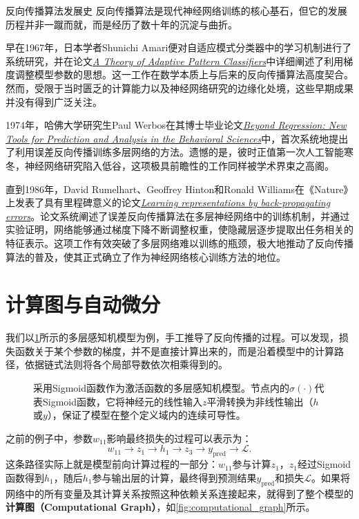 \begin{cyanBox}{反向传播算法发展史}
反向传播算法是现代神经网络训练的核心基石，但它的发展历程并非一蹴而就，而是经历了数十年的沉淀与曲折。

早在1967年，日本学者Shunichi Amari便对自适应模式分类器中的学习机制进行了系统研究，并在论文\href{https://ieeexplore.ieee.org/document/4039068}{\textit{A Theory of Adaptive Pattern Classifiers}}中详细阐述了利用梯度调整模型参数的思想。这一工作在数学本质上与后来的反向传播算法高度契合。然而，受限于当时匮乏的计算能力以及神经网络研究的边缘化处境，这些早期成果并没有得到广泛关注。

1974年，哈佛大学研究生Paul Werbos在其博士毕业论文\href{https://perceptrondemo.com/assets/PJW_thesis_Beyond_Regression_1974-4b63aa5f.pdf}{\textit{Beyond Regression: New Tools for Prediction and Analysis in the Behavioral Sciences}}中，首次系统地提出了利用误差反向传播训练多层网络的方法。遗憾的是，彼时正值第一次人工智能寒冬，神经网络研究陷入低谷，这项极具前瞻性的工作同样被学术界束之高阁。

直到1986年，David Rumelhart、Geoffrey Hinton和Ronald Williams在《Nature》上发表了具有里程碑意义的论文\href{https://www.nature.com/articles/323533a0}{\textit{Learning representations by back-propagating errors}}。论文系统阐述了误差反向传播算法在多层神经网络中的训练机制，并通过实验证明，网络能够通过梯度下降不断调整权重，使隐藏层逐步提取出任务相关的特征表示。这项工作有效突破了多层网络难以训练的瓶颈，极大地推动了反向传播算法的普及，使其正式确立了作为神经网络核心训练方法的地位。
\end{cyanBox}

\section{计算图与自动微分}

我们以\cref{fig:mlp_repeat}所示的多层感知机模型为例，手工推导了反向传播的过程。可以发现，损失函数关于某个参数的梯度，并不是直接计算出来的，而是沿着模型中的计算路径，依据链式法则将各个局部导数依次相乘得到的。

\begin{figure}[H]
    \caption{采用Sigmoid函数作为激活函数的多层感知机模型。节点内的$\sigma(\cdot)$代表Sigmoid函数，它将神经元的线性输入$z$平滑转换为非线性输出（$h$或$y$），保证了模型在整个定义域内的连续可导性。}
    \label{fig:mlp_repeat}
\end{figure}

之前的例子中，参数$w_{11}$影响最终损失的过程可以表示为：
$$
w_{11}\rightarrow z_1\rightarrow h_1\rightarrow z_3\rightarrow y_{\text{pred}}\rightarrow\mathcal{L}.
$$
这条路径实际上就是模型前向计算过程的一部分：$w_{11}$参与计算$z_1$，$z_1$经过Sigmoid函数得到$h_1$，随后$h_1$参与输出层的计算，最终得到预测结果$y_{\text{pred}}$和损失$\mathcal{L}$。如果将网络中的所有变量及其计算关系按照这种依赖关系连接起来，就得到了整个模型的\textbf{计算图（Computational Graph）}，如\cref{fig:computational_graph}所示。


